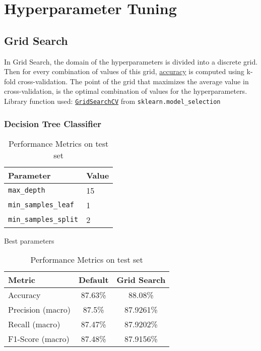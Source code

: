 \newpage
\section{Hyperparameter Tuning}
\subsection{Grid Search}
In Grid Search, the domain of the hyperparameters is divided into a discrete grid. Then for every combination of values of this grid, \hyperlink{acc_def}{accuracy} is computed using k-fold cross-validation. The point of the grid that maximizes the average value in cross-validation, is the optimal combination of values for the hyperparameters.
\\
Library function used: \texttt{\href{https://scikit-learn.org/stable/modules/generated/sklearn.model_selection.GridSearchCV.html}{GridSearchCV}} from \texttt{sklearn.model\_selection}
\subsubsection{Decision Tree Classifier}
\begin{table}[h!]
  \begin{minipage}{.5\linewidth}
    \centering
    \begin{tabular}{|l|l|}
      \hline
      \textbf{Parameter} & \textbf{Value} \\
      \hline
      \texttt{max\_depth} & 15 \\
      \texttt{min\_samples\_leaf} & 1 \\
      \texttt{min\_samples\_split} & 2\\
      \hline
    \end{tabular}
    \caption{Best parameters}
  \end{minipage}%
  \begin{minipage}{.5\linewidth}
    \centering
    \begin{tabular}{|l|c|c|}
      \hline
      \textbf{Metric} & \textbf{Default} & \textbf{Grid Search} \\
      \hline
      Accuracy & 87.63\% & 88.08\% \\
      Precision (macro) & 87.5\% & 87.9261\% \\
      Recall (macro) & 87.47\% & 87.9202\% \\
      F1-Score (macro) & 87.48\% & 87.9156\% \\
      \hline
    \end{tabular}
    \caption{Performance Metrics on test set}
  \end{minipage}
\end{table}


